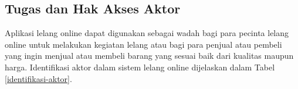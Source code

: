 \subsection{Tugas dan Hak Akses Aktor}
	\label{identifikasi_pengguna}

	\indent Aplikasi lelang online dapat digunakan sebagai wadah bagi para pecinta lelang online untuk melakukan kegiatan lelang atau bagi para penjual atau pembeli yang ingin menjual atau membeli barang yang sesuai baik dari kualitas maupun harga. Identifikasi aktor dalam sistem lelang online dijelaskan dalam Tabel \ref{identifikasi-aktor}.
	
	
	
	
	 
